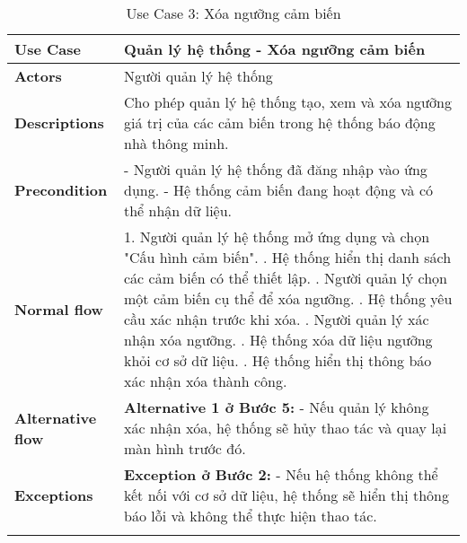 \begin{longtable}{|p{}|p{}|}
    \hline
    \textbf{Use Case}         & \textbf{Quản lý hệ thống - Xóa ngưỡng cảm biến}                                                                   \\
    \hline
    \textbf{Actors}           & Người quản lý hệ thống                                                                                            \\
    \hline
    \textbf{Descriptions}     & Cho phép quản lý hệ thống tạo, xem và xóa ngưỡng giá trị của các cảm biến trong hệ thống báo động nhà thông minh. \\
    \hline
    \textbf{Precondition}     &
    - Người quản lý hệ thống đã đăng nhập vào ứng dụng. \newline
    - Hệ thống cảm biến đang hoạt động và có thể nhận dữ liệu.                                                                                    \\
    \hline
    \textbf{Normal flow}      &
    1. Người quản lý hệ thống mở ứng dụng và chọn "Cấu hình cảm biến". \newline
    2. Hệ thống hiển thị danh sách các cảm biến có thể thiết lập. \newline
    3. Người quản lý chọn một cảm biến cụ thể để xóa ngưỡng. \newline
    4. Hệ thống yêu cầu xác nhận trước khi xóa. \newline
    5. Người quản lý xác nhận xóa ngưỡng. \newline
    6. Hệ thống xóa dữ liệu ngưỡng khỏi cơ sở dữ liệu. \newline
    7. Hệ thống hiển thị thông báo xác nhận xóa thành công.                                                                                       \\
    \hline
    \textbf{Alternative flow} &
    \textbf{Alternative 1 ở Bước 5:} \newline
    - Nếu quản lý không xác nhận xóa, hệ thống sẽ hủy thao tác và quay lại màn hình trước đó.                                                     \\
    \hline
    \textbf{Exceptions}       &
    \textbf{Exception ở Bước 2:} \newline
    - Nếu hệ thống không thể kết nối với cơ sở dữ liệu, hệ thống sẽ hiển thị thông báo lỗi và không thể thực hiện thao tác.                       \\
    \hline
    \caption{Use Case 3: Xóa ngưỡng cảm biến}
    \label{tab:usecase3}
\end{longtable}


